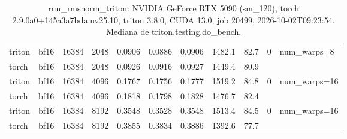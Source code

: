 \begin{table}[htbp]
\begin{tabular}{llrrrrrrrll}
    triton & bf16 & 16384 & 2048 & 0.0906 & 0.0886 & 0.0906 & 1482.1 & 82.7 & 0 & num\_warps=8 \\
    torch & bf16 & 16384 & 2048 & 0.0926 & 0.0916 & 0.0927 & 1449.4 & 80.9 &  &  \\
    triton & bf16 & 16384 & 4096 & 0.1767 & 0.1756 & 0.1777 & 1519.2 & 84.8 & 0 & num\_warps=16 \\
    torch & bf16 & 16384 & 4096 & 0.1818 & 0.1798 & 0.1828 & 1476.7 & 82.4 &  &  \\
    triton & bf16 & 16384 & 8192 & 0.3548 & 0.3528 & 0.3548 & 1513.4 & 84.5 & 0 & num\_warps=16 \\
    torch & bf16 & 16384 & 8192 & 0.3855 & 0.3834 & 0.3886 & 1392.6 & 77.7 &  &  \\
    \bottomrule
  \end{tabular}
  \caption{run\_rmsnorm\_triton: NVIDIA GeForce RTX 5090 (sm\_120), torch 2.9.0a0+145a3a7bda.nv25.10, triton 3.8.0, CUDA 13.0; job 20499, 2026-10-02T09:23:54. Mediana de triton.testing.do\_bench.}
  \label{tab:pascal-run-rmsnorm-triton}
\end{table}
